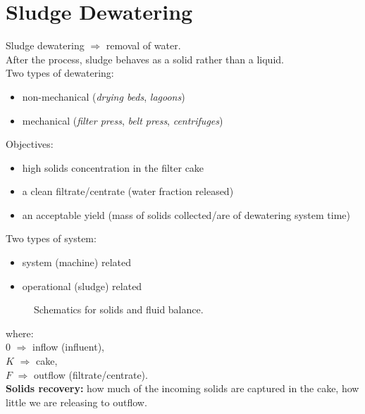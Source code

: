 \documentclass{article}
\numberwithin{equation}{section}
\begin{document}
\section{Sludge Dewatering}
Sludge dewatering $\Rightarrow$ removal of water.\\
After the process, sludge behaves as a solid rather than a liquid.\\
Two types of dewatering:
\begin{itemize}
    \item non-mechanical (\emph{drying beds}, \emph{lagoons})
    \item mechanical (\emph{filter press}, \emph{belt press}, \emph{centrifuges})
\end{itemize}
Objectives:
\begin{itemize}
    \item high solids concentration in the filter cake
    \item a clean filtrate/centrate (water fraction released)
    \item an acceptable yield (mass of solids collected/are of dewatering system time)
\end{itemize}
Two types of system:
\begin{itemize}
    \item system (machine) related
    \item operational (sludge) related
\end{itemize}
\begin{figure}[htbp]
    \centering
    \caption{Schematics for solids and fluid balance.}
    \label{fig:balance}
\end{figure}
where:\\
$0$ $\Rightarrow$ inflow (influent),\\
$K$ $\Rightarrow$ cake,\\
$F$ $\Rightarrow$ outflow (filtrate/centrate).\\
\textbf{Solids recovery:} how much of the incoming solids are captured in the cake, how little we are releasing to outflow.
\end{document}
